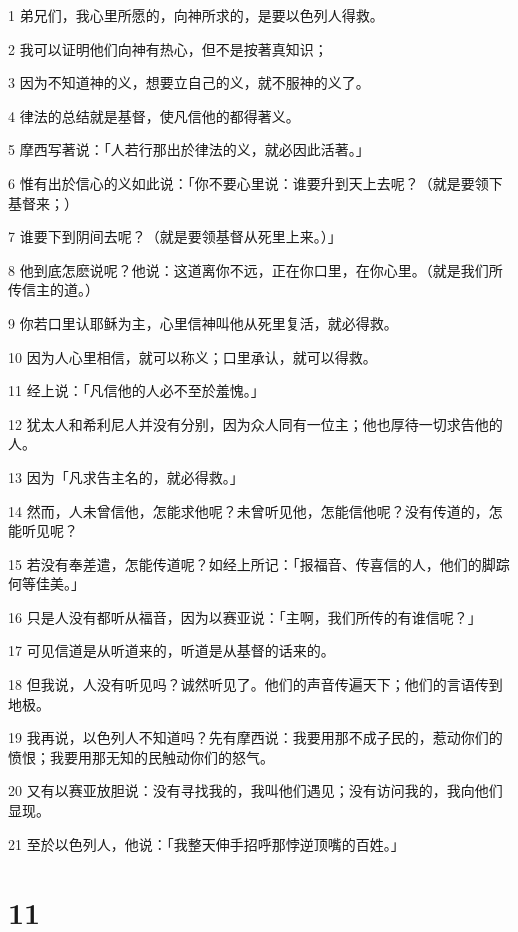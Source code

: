 \par 1 弟兄们，我心里所愿的，向神所求的，是要以色列人得救。
\par 2 我可以证明他们向神有热心，但不是按著真知识；
\par 3 因为不知道神的义，想要立自己的义，就不服神的义了。
\par 4 律法的总结就是基督，使凡信他的都得著义。
\par 5 摩西写著说：「人若行那出於律法的义，就必因此活著。」
\par 6 惟有出於信心的义如此说：「你不要心里说：谁要升到天上去呢？（就是要领下基督来；）
\par 7 谁要下到阴间去呢？（就是要领基督从死里上来。）」
\par 8 他到底怎麽说呢？他说：这道离你不远，正在你口里，在你心里。（就是我们所传信主的道。）
\par 9 你若口里认耶稣为主，心里信神叫他从死里复活，就必得救。
\par 10 因为人心里相信，就可以称义；口里承认，就可以得救。
\par 11 经上说：「凡信他的人必不至於羞愧。」
\par 12 犹太人和希利尼人并没有分别，因为众人同有一位主；他也厚待一切求告他的人。
\par 13 因为「凡求告主名的，就必得救。」
\par 14 然而，人未曾信他，怎能求他呢？未曾听见他，怎能信他呢？没有传道的，怎能听见呢？
\par 15 若没有奉差遣，怎能传道呢？如经上所记：「报福音、传喜信的人，他们的脚踪何等佳美。」
\par 16 只是人没有都听从福音，因为以赛亚说：「主啊，我们所传的有谁信呢？」
\par 17 可见信道是从听道来的，听道是从基督的话来的。
\par 18 但我说，人没有听见吗？诚然听见了。他们的声音传遍天下；他们的言语传到地极。
\par 19 我再说，以色列人不知道吗？先有摩西说：我要用那不成子民的，惹动你们的愤恨；我要用那无知的民触动你们的怒气。
\par 20 又有以赛亚放胆说：没有寻找我的，我叫他们遇见；没有访问我的，我向他们显现。
\par 21 至於以色列人，他说：「我整天伸手招呼那悖逆顶嘴的百姓。」

\chapter{11}

